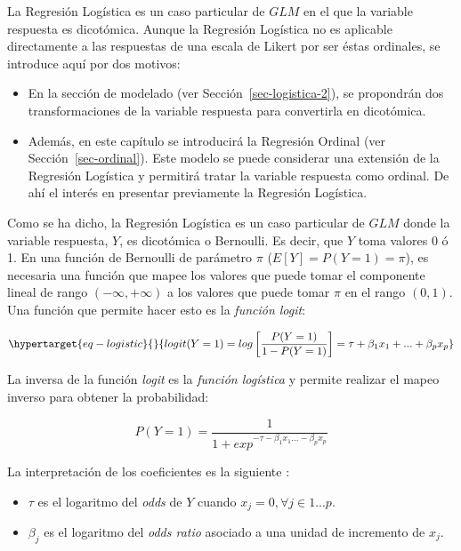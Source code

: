 \documentclass[
  12pt,
  a4paper,
  extrafontsizes,
  onecolumn,
  openright,
  table]{memoir}
\providecommand{\tightlist}{%
  \setlength{\itemsep}{0pt}\setlength{\parskip}{0pt}}\usepackage{longtable,booktabs,array}
\begin{document}
La \gls{Regresión Logística} es un caso particular de \(GLM\) en el que
la variable respuesta es dicotómica. Aunque la Regresión Logística no es
aplicable directamente a las respuestas de una escala de Likert por ser
éstas ordinales, se introduce aquí por dos motivos:

\begin{itemize}
\tightlist
\item
  En la sección de modelado (ver Sección~\ref{sec-logistica-2}), se
  propondrán dos transformaciones de la variable respuesta para
  convertirla en dicotómica.
\item
  Además, en este capítulo se introducirá la Regresión Ordinal (ver
  Sección~\ref{sec-ordinal}). Este modelo se puede considerar una
  extensión de la Regresión Logística y permitirá tratar la variable
  respuesta como ordinal. De ahí el interés en presentar previamente la
  Regresión Logística.
\end{itemize}

Como se ha dicho, la \gls{Regresión Logística}
\autocite[ver][pp.~68-69]{agresti_2018} es un caso particular de \(GLM\)
donde la variable respuesta, \(Y\), es dicotómica o Bernoulli. Es decir,
que \(Y\) toma valores 0 ó 1. En una función de Bernoulli de parámetro
\(\pi\) (\(E[Y] = P(Y=1) = \pi\)), es necesaria una función que mapee
los valores que puede tomar el componente lineal de rango
\((-\infty, +\infty)\) a los valores que puede tomar \(\pi\) en el rango
\((0, 1)\). Una función que permite hacer esto es la
\emph{\gls{función logit}}:

\begin{equation}\protect\hypertarget{eq-logistic}{}{
logit(Y=1) = log \left[\frac{P(Y=1)}{1-P(Y=1)} \right] = \tau+\beta_1x_1+...+\beta_px_p
}\label{eq-logistic}\end{equation}

La inversa de la función \emph{logit} es la
\emph{\gls{función logística}} y permite realizar el mapeo inverso para
obtener la probabilidad:

\[
P(Y=1) = \frac{1}{1 + exp^{-\tau-\beta_1x_1...-\beta_px_p}}
\]

La interpretación de los coeficientes es la siguiente
\autocite[ver][p.~260]{frienly2015}:

\begin{itemize}
\tightlist
\item
  \(\tau\) es el logaritmo del \emph{\gls{odds}} de \(Y\) cuando
  \(x_j=0, \forall j \in 1...p\).
\item
  \(\beta_j\) es el logaritmo del \emph{\gls{odds ratio}} asociado a una
  unidad de incremento de \(x_j\).
\end{itemize}
\end{document}
